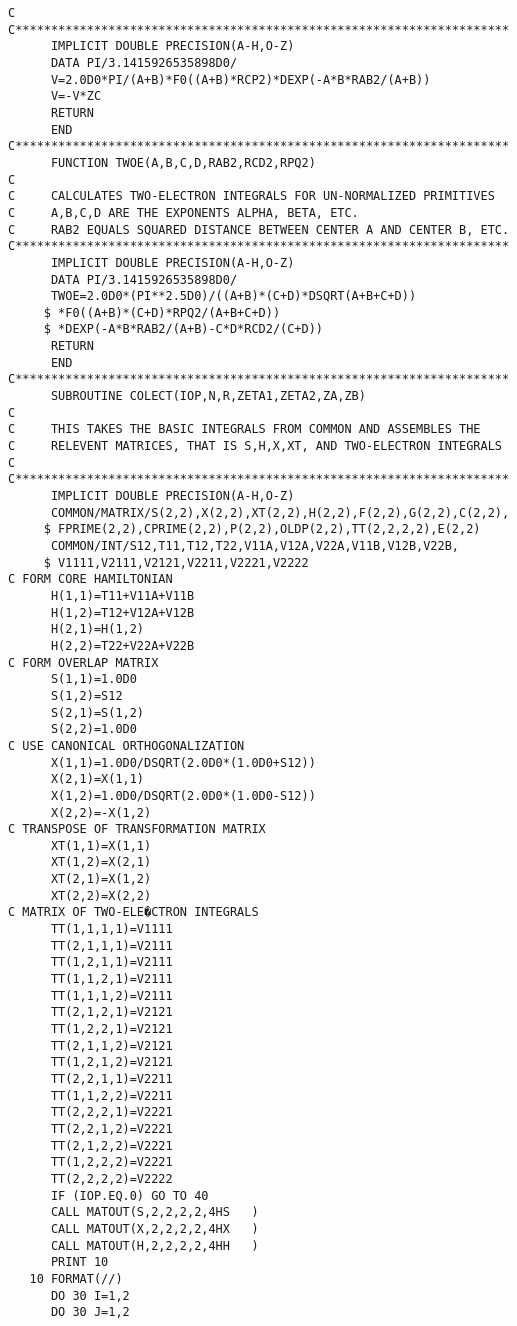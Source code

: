 \begin{verbatim}
C
C*********************************************************************
      IMPLICIT DOUBLE PRECISION(A-H,O-Z)
      DATA PI/3.1415926535898D0/
      V=2.0D0*PI/(A+B)*F0((A+B)*RCP2)*DEXP(-A*B*RAB2/(A+B))
      V=-V*ZC
      RETURN
      END
C*********************************************************************
      FUNCTION TWOE(A,B,C,D,RAB2,RCD2,RPQ2)
C
C     CALCULATES TWO-ELECTRON INTEGRALS FOR UN-NORMALIZED PRIMITIVES
C     A,B,C,D ARE THE EXPONENTS ALPHA, BETA, ETC.
C     RAB2 EQUALS SQUARED DISTANCE BETWEEN CENTER A AND CENTER B, ETC.
C*********************************************************************
      IMPLICIT DOUBLE PRECISION(A-H,O-Z)
      DATA PI/3.1415926535898D0/
      TWOE=2.0D0*(PI**2.5D0)/((A+B)*(C+D)*DSQRT(A+B+C+D))
     $ *F0((A+B)*(C+D)*RPQ2/(A+B+C+D))
     $ *DEXP(-A*B*RAB2/(A+B)-C*D*RCD2/(C+D))
      RETURN
      END
C*********************************************************************
      SUBROUTINE COLECT(IOP,N,R,ZETA1,ZETA2,ZA,ZB)
C
C     THIS TAKES THE BASIC INTEGRALS FROM COMMON AND ASSEMBLES THE
C     RELEVENT MATRICES, THAT IS S,H,X,XT, AND TWO-ELECTRON INTEGRALS
C
C*********************************************************************
      IMPLICIT DOUBLE PRECISION(A-H,O-Z)
      COMMON/MATRIX/S(2,2),X(2,2),XT(2,2),H(2,2),F(2,2),G(2,2),C(2,2),
     $ FPRIME(2,2),CPRIME(2,2),P(2,2),OLDP(2,2),TT(2,2,2,2),E(2,2)
      COMMON/INT/S12,T11,T12,T22,V11A,V12A,V22A,V11B,V12B,V22B,
     $ V1111,V2111,V2121,V2211,V2221,V2222
C FORM CORE HAMILTONIAN
      H(1,1)=T11+V11A+V11B
      H(1,2)=T12+V12A+V12B
      H(2,1)=H(1,2)
      H(2,2)=T22+V22A+V22B
C FORM OVERLAP MATRIX
      S(1,1)=1.0D0
      S(1,2)=S12
      S(2,1)=S(1,2)
      S(2,2)=1.0D0
C USE CANONICAL ORTHOGONALIZATION
      X(1,1)=1.0D0/DSQRT(2.0D0*(1.0D0+S12))
      X(2,1)=X(1,1)
      X(1,2)=1.0D0/DSQRT(2.0D0*(1.0D0-S12))
      X(2,2)=-X(1,2)
C TRANSPOSE OF TRANSFORMATION MATRIX
      XT(1,1)=X(1,1)
      XT(1,2)=X(2,1)
      XT(2,1)=X(1,2)
      XT(2,2)=X(2,2)
C MATRIX OF TWO-ELE�CTRON INTEGRALS
      TT(1,1,1,1)=V1111
      TT(2,1,1,1)=V2111
      TT(1,2,1,1)=V2111
      TT(1,1,2,1)=V2111
      TT(1,1,1,2)=V2111
      TT(2,1,2,1)=V2121
      TT(1,2,2,1)=V2121
      TT(2,1,1,2)=V2121
      TT(1,2,1,2)=V2121
      TT(2,2,1,1)=V2211
      TT(1,1,2,2)=V2211
      TT(2,2,2,1)=V2221
      TT(2,2,1,2)=V2221
      TT(2,1,2,2)=V2221
      TT(1,2,2,2)=V2221
      TT(2,2,2,2)=V2222
      IF (IOP.EQ.0) GO TO 40
      CALL MATOUT(S,2,2,2,2,4HS   )
      CALL MATOUT(X,2,2,2,2,4HX   )
      CALL MATOUT(H,2,2,2,2,4HH   )
      PRINT 10
   10 FORMAT(//)
      DO 30 I=1,2
      DO 30 J=1,2

\end{verbatim}
